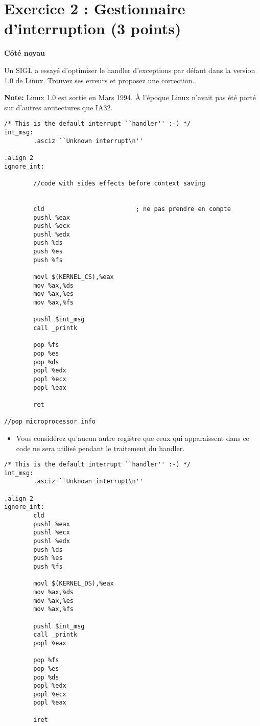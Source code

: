 \section*{Exercice 2 : Gestionnaire d'interruption (3 points)}

{\bf C\^ot\'e noyau}

Un SIGL a essay\'e d'optimiser le handler d'exceptions par d\'efaut dans la version 1.0 de Linux. Trouvez ses erreurs et proposez une correction.

{\bf Note:} Linux 1.0 est sortie en Mars 1994. \`A l'\'epoque Linux n'avait pas \'et\'e port\'e sur d'autres arcitectures que IA32.

\begin{verbatim}
/* This is the default interrupt ``handler'' :-) */
int_msg:
        .asciz ``Unknown interrupt\n''

.align 2
ignore_int:

        //code with sides effects before context saving


        cld                         ; ne pas prendre en compte
        pushl %eax
        pushl %ecx
        pushl %edx
        push %ds
        push %es
        push %fs

        movl $(KERNEL_CS),%eax
        mov %ax,%ds
        mov %ax,%es
        mov %ax,%fs

        pushl $int_msg
        call _printk

        pop %fs
        pop %es
        pop %ds
        popl %edx
        popl %ecx
        popl %eax

        ret

//pop microprocessor info
\end{verbatim}

\begin{itemize}
\item Vous consid\'erez qu'aucun autre registre que ceux qui apparaissent dans ce code ne sera utilis\'e pendant le traitement du handler.
\end{itemize}

\begin{correction}
\begin{verbatim}
/* This is the default interrupt ``handler'' :-) */
int_msg:
        .asciz ``Unknown interrupt\n''

.align 2
ignore_int:
        cld
        pushl %eax
        pushl %ecx
        pushl %edx
        push %ds
        push %es
        push %fs

        movl $(KERNEL_DS),%eax
        mov %ax,%ds
        mov %ax,%es
        mov %ax,%fs

        pushl $int_msg
        call _printk
        popl %eax

        pop %fs
        pop %es
        pop %ds
        popl %edx
        popl %ecx
        popl %eax

        iret
\end{verbatim}
\end{correction}




